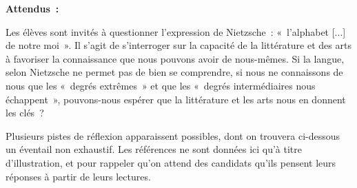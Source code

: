 {\textbf{Attendus~:}

Les élèves sont invités à questionner l'expression de Nietzsche~: «~l'alphabet [...] de
notre moi~». Il s'agit de s'interroger sur la capacité de la littérature et des arts à favoriser
la connaissance que nous pouvons avoir de nous-mêmes. Si la langue, selon
Nietzsche ne permet pas de bien se comprendre, si nous ne connaissons de nous que
les «~degrés extrêmes~» et que les «~degrés intermédiaires nous échappent~»,
pouvons-nous espérer que la littérature et les arts nous en donnent les clés~?

Plusieurs pistes de réflexion apparaissent possibles, dont on trouvera ci-dessous un
éventail non exhaustif. Les références ne sont données ici qu'à titre d'illustration, et
pour rappeler qu'on attend des candidats qu'ils pensent leurs réponses à partir de leurs
lectures.

}
